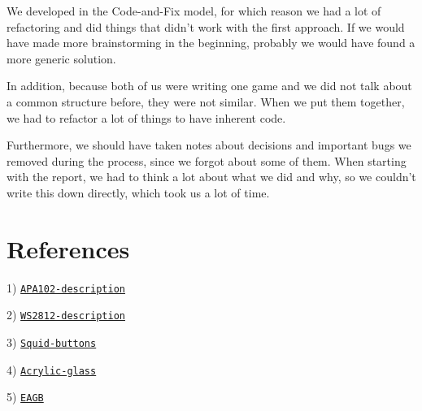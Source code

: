 \documentclass[a4paper,12pt]{article}
\begin{document}
We developed in the Code-and-Fix model, for which reason we had a lot of refactoring and did things that didn't work with the first approach.
 If we would have made more brainstorming in the beginning, probably we would have found a more generic solution.
 
 In addition, because both of us were writing one game and we did not talk about a common structure before, they were not similar.
 When we put them together, we had to refactor a lot of things to have inherent code.

Furthermore, we should have taken notes about decisions and important bugs we removed during the process, since we forgot about some of them.
 When starting with the report, we had to think a lot about what we did and why, so we couldn't write this down directly, which took us a lot of time.

\section{References}

1) \href{https://cpldcpu.wordpress.com/2014/11/30/understanding-the-apa102-superled/}{\nolinkurl{APA102-description}}

2) \href{https://cpldcpu.wordpress.com/2014/01/14/light_ws2812-library-v2-0-part-i-understanding-the-ws2812/}{\nolinkurl{WS2812-description}}

3) \href{https://www.robotshop.com/de/de/squid-schalter-fur-raspberry-pi-von-monk-makes.html}{\nolinkurl{Squid-buttons}}

4) \href{https://www.plexiglas-shop.com/Products/PLWH72-GT-3-00-3050X2030-B-01-L.html}{\nolinkurl{Acrylic-glass}}

5) \href{https://www.eagb.ch}{\nolinkurl{EAGB}}
\end{document}
